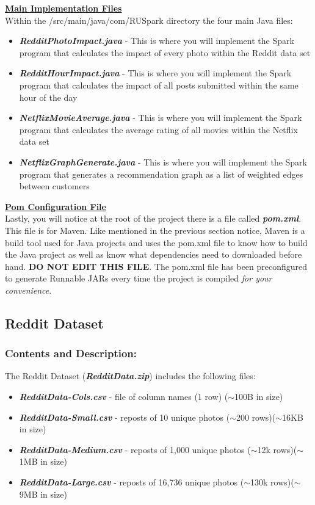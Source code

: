 \documentclass{article}
\begin{document}
\noindent \textbf{\underline{Main Implementation Files}} \vspace{0.2cm} \\
\noindent Within the /src/main/java/com/RUSpark directory the four main Java files:
\begin{itemize}
    \item \textbf{\textit{RedditPhotoImpact.java}} - This is where you will implement the Spark program that calculates the impact of every photo within the Reddit data set
    \item \textbf{\textit{RedditHourImpact.java}} - This is where you will implement the Spark program that calculates the impact of all posts submitted within the same hour of the day
    \item \textbf{\textit{NetflixMovieAverage.java}} - This is where you will implement the Spark program that calculates the average rating of all movies within the Netflix data set 
    \item \textbf{\textit{NetflixGraphGenerate.java}} - This is where you will implement the Spark program that generates a recommendation graph as a list of weighted edges between customers
\end{itemize}

\noindent \textbf{\underline{Pom Configuration File}} \vspace{0.2cm} \\
\noindent Lastly, you will notice at the root of the project there is a file called \textbf{\textit{pom.xml}}. This file is for Maven. Like mentioned in the previous section notice, Maven is a build tool used for Java projects and uses the pom.xml file to know how to build the Java project as well as know what dependencies need to downloaded before hand. \textbf{DO NOT EDIT THIS FILE}. The pom.xml file has been preconfigured to generate Runnable JARs every time the project is compiled \textit{for your convenience}. 



\subsection{Reddit Dataset}

\subsubsection*{Contents and Description:}
The Reddit Dataset (\textbf{\textit{RedditData.zip}}) includes the following files:
\begin{itemize}
    \item \textit{\textbf{RedditData-Cols.csv}} - file of column names (1 row) ($\sim$100B in size)
    \item \textit{\textbf{RedditData-Small.csv}} - reposts of 10 unique photos ($\sim$200 rows)($\sim$16KB in size)
    \item \textit{\textbf{RedditData-Medium.csv}} - reposts of 1,000 unique photos ($\sim$12k rows)($\sim$1MB in size)
    \item \textit{\textbf{RedditData-Large.csv}} - reposts of 16,736 unique photos ($\sim$130k rows)($\sim$9MB in size)
\end{itemize}
\end{document}
